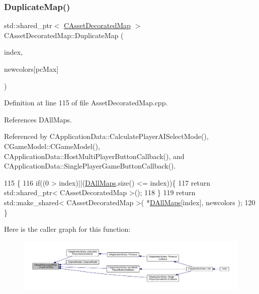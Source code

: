 \subsubsection{\texorpdfstring{Duplicate\+Map()}{DuplicateMap()}}
{\footnotesize\ttfamily std\+::shared\+\_\+ptr$<$ \hyperlink{classCAssetDecoratedMap}{C\+Asset\+Decorated\+Map} $>$ C\+Asset\+Decorated\+Map\+::\+Duplicate\+Map (\begin{DoxyParamCaption}\item[{int}]{index,  }\item[{\hyperlink{GameDataTypes_8h_aafb0ca75933357ff28a6d7efbdd7602f}{E\+Player\+Color}}]{newcolors\mbox{[}pc\+Max\mbox{]} }\end{DoxyParamCaption})\hspace{0.3cm}{\ttfamily [static]}}



Definition at line 115 of file Asset\+Decorated\+Map.\+cpp.



References D\+All\+Maps.



Referenced by C\+Application\+Data\+::\+Calculate\+Player\+A\+I\+Select\+Mode(), C\+Game\+Model\+::\+C\+Game\+Model(), C\+Application\+Data\+::\+Host\+Multi\+Player\+Button\+Callback(), and C\+Application\+Data\+::\+Single\+Player\+Game\+Button\+Callback().


\begin{DoxyCode}
115                                                                                                            
       \{
116     \textcolor{keywordflow}{if}((0 > index)||(\hyperlink{classCAssetDecoratedMap_a32cdd80c7e9d31d8ce5397dd6d61dc4b}{DAllMaps}.size() <= index))\{
117         \textcolor{keywordflow}{return} std::shared\_ptr< CAssetDecoratedMap >();
118     \}
119     \textcolor{keywordflow}{return} std::make\_shared< CAssetDecoratedMap >( *\hyperlink{classCAssetDecoratedMap_a32cdd80c7e9d31d8ce5397dd6d61dc4b}{DAllMaps}[index], newcolors );
120 \}
\end{DoxyCode}
Here is the caller graph for this function\+:\nopagebreak
\begin{figure}[H]
\begin{center}
\leavevmode
\includegraphics[width=350pt]{classCAssetDecoratedMap_a9d0fa2b32e4e8add6da83a7ebcfab6d8_icgraph}
\end{center}
\end{figure}
\hypertarget{classCAssetDecoratedMap_a82c30235ceaa63c7382c662687acf9fe}{}\label{classCAssetDecoratedMap_a82c30235ceaa63c7382c662687acf9fe} 

